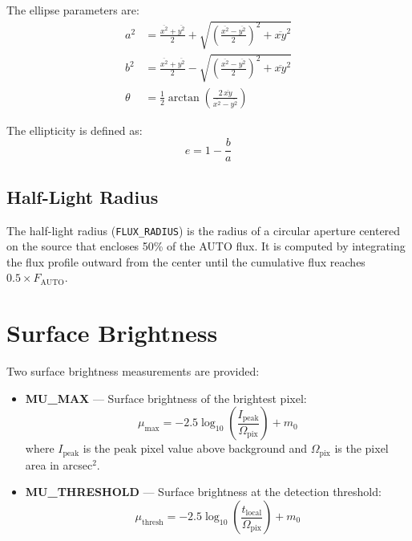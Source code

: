 \documentclass[11pt,fleqn]{book}
\begin{document}
The ellipse parameters are:
\begin{align}
a^2 &= \frac{\overline{x^2} + \overline{y^2}}{2} + \sqrt{\left(\frac{\overline{x^2} - \overline{y^2}}{2}\right)^2 + \overline{xy}^2} \\
b^2 &= \frac{\overline{x^2} + \overline{y^2}}{2} - \sqrt{\left(\frac{\overline{x^2} - \overline{y^2}}{2}\right)^2 + \overline{xy}^2} \\
\theta &= \frac{1}{2}\arctan\!\left(\frac{2\,\overline{xy}}{\overline{x^2} - \overline{y^2}}\right)
\end{align}

The ellipticity is defined as:
\begin{equation}
e = 1 - \frac{b}{a}
\end{equation}

\subsection{Half-Light Radius}

The half-light radius (\texttt{FLUX\_RADIUS}) is the radius of a circular aperture centered on the source that encloses 50\% of the AUTO flux. It is computed by integrating the flux profile outward from the center until the cumulative flux reaches $0.5 \times F_{\text{AUTO}}$.

\section{Surface Brightness}

Two surface brightness measurements are provided:

\begin{itemize}[leftmargin=2em]
  \item \textbf{MU\_MAX} --- Surface brightness of the brightest pixel:
  \begin{equation}
    \mu_{\max} = -2.5\log_{10}\!\left(\frac{I_{\text{peak}}}{\Omega_{\text{pix}}}\right) + m_0
  \end{equation}
  where $I_{\text{peak}}$ is the peak pixel value above background and $\Omega_{\text{pix}}$ is the pixel area in arcsec$^2$.

  \item \textbf{MU\_THRESHOLD} --- Surface brightness at the detection threshold:
  \begin{equation}
    \mu_{\text{thresh}} = -2.5\log_{10}\!\left(\frac{t_{\text{local}}}{\Omega_{\text{pix}}}\right) + m_0
  \end{equation}
\end{itemize}
\end{document}
